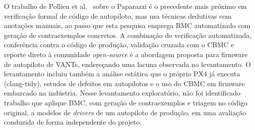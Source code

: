 O trabalho de Pollien et al.~\cite{Pollien2021} sobre o Paparazzi é o precedente
mais próximo em verificação formal de código de autopiloto, mas usa técnicas
dedutivas com anotações manuais, ao passo que esta pesquisa emprega BMC
automatizado com geração de contraexemplos concretos. A combinação de verificação
automatizada, conferência contra o código de produção, validação cruzada com o
CBMC e reporte direto à comunidade \textit{open-source} é a abordagem proposta
para firmware de autopiloto de VANTs, endereçando uma lacuna observada no
levantamento. O levantamento incluiu também a análise estática que o próprio PX4 já
executa (clang-tidy), estudos de defeitos em autopilotos e o uso do CBMC em firmware
embarcado na indústria. Nesse levantamento exploratório, não foi identificado trabalho que aplique BMC,
com geração de contraexemplos e triagem no código original, a modelos de
\textit{drivers} de um autopiloto de produção, em uma avaliação conduzida de
forma independente do projeto.
